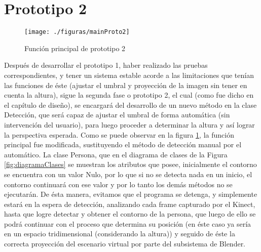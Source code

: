 \documentclass[a4paper,openright,12pt]{report}
\begin{document}
\section{Prototipo 2}
\begin{figure}[H]
	\centering
	\texttt{[image: ./figuras/mainProto2]}
	\caption{Función principal de prototipo 2} 
	\label{fig:mainProto2}
\end{figure}
Después de desarrollar el prototipo 1, haber realizado las pruebas correspondientes, y tener un sistema estable acorde a las limitaciones que tenían las funciones de éste (ajustar el umbral y proyección de la imagen sin tener en cuenta la altura), sigue la segunda fase o prototipo 2, el cual (como fue dicho en el capítulo de diseño), se encargará del desarrollo de un nuevo método en la clase Detección, que será capaz de ajustar el umbral de forma automática (sin intervención del usuario), para luego proceder a determinar la altura y así lograr la perspectiva esperada. Como se puede observar en la figura \ref{fig:mainProto2}, la función principal fue modificada, sustituyendo el método de detección manual por el automático. La clase Persona, que en el diagrama de clases de la Figura \ref{fig:diagramaClases} se muestran los atributos que posee, inicialmente el contorno se encuentra con un valor Nulo, por lo que si no se detecta nada en un inicio, el contorno continuará con ese valor y por lo tanto los demás métodos no se ejecutarán. De ésta manera, evitamos que el programa se detenga, y simplemente estará en la espera de detección, analizando cada frame capturado por el Kinect\textcopyright, hasta que logre detectar y obtener el contorno de la persona, que luego de ello se podrá continuar con el proceso que determina su posición (en éste caso ya sería en un espacio tridimensional (considerando la altura)) y seguido de éste la correcta proyección del escenario virtual por parte del subsistema de Blender\textcopyright.
\end{document}
